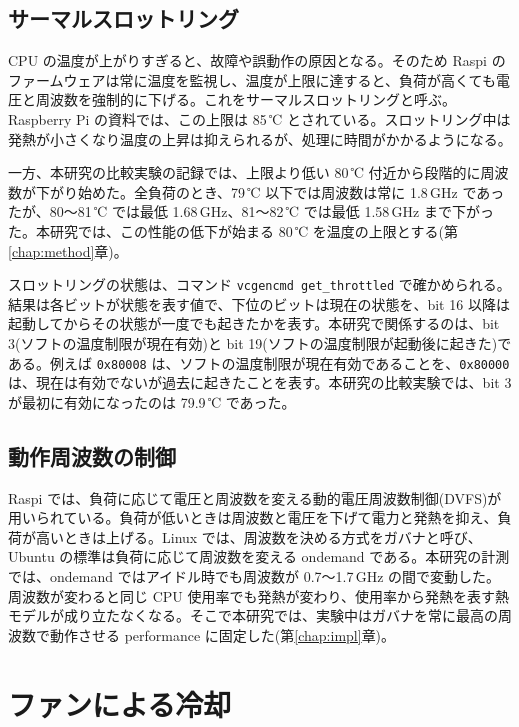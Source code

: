 \subsection{サーマルスロットリング}
CPU の温度が上がりすぎると、故障や誤動作の原因となる。そのため Raspi のファームウェアは常に温度を監視し、温度が上限に達すると、負荷が高くても電圧と周波数を強制的に下げる。これをサーマルスロットリングと呼ぶ。Raspberry Pi の資料では、この上限は 85\,℃ とされている\cite{rpi2026cooling}。スロットリング中は発熱が小さくなり温度の上昇は抑えられるが、処理に時間がかかるようになる。

一方、本研究の比較実験の記録では、上限より低い 80\,℃ 付近から段階的に周波数が下がり始めた。全負荷のとき、79\,℃ 以下では周波数は常に 1.8\,GHz であったが、80〜81\,℃ では最低 1.68\,GHz、81〜82\,℃ では最低 1.58\,GHz まで下がった。本研究では、この性能の低下が始まる 80\,℃ を温度の上限とする(第\ref{chap:method}章)。

スロットリングの状態は、コマンド \texttt{vcgencmd get\_throttled} で確かめられる。結果は各ビットが状態を表す値で、下位のビットは現在の状態を、bit 16 以降は起動してからその状態が一度でも起きたかを表す。本研究で関係するのは、bit 3(ソフトの温度制限が現在有効)と bit 19(ソフトの温度制限が起動後に起きた)である。例えば \texttt{0x80008} は、ソフトの温度制限が現在有効であることを、\texttt{0x80000} は、現在は有効でないが過去に起きたことを表す。本研究の比較実験では、bit 3 が最初に有効になったのは 79.9\,℃ であった。

\subsection{動作周波数の制御}
Raspi では、負荷に応じて電圧と周波数を変える動的電圧周波数制御(DVFS)が用いられている\cite{rpi2026cooling}。負荷が低いときは周波数と電圧を下げて電力と発熱を抑え、負荷が高いときは上げる。Linux では、周波数を決める方式をガバナと呼び、Ubuntu の標準は負荷に応じて周波数を変える ondemand である。本研究の計測では、ondemand ではアイドル時でも周波数が 0.7〜1.7\,GHz の間で変動した。周波数が変わると同じ CPU 使用率でも発熱が変わり、使用率から発熱を表す熱モデルが成り立たなくなる。そこで本研究では、実験中はガバナを常に最高の周波数で動作させる performance に固定した(第\ref{chap:impl}章)。

\section{ファンによる冷却}\label{sec:bg-fan}
